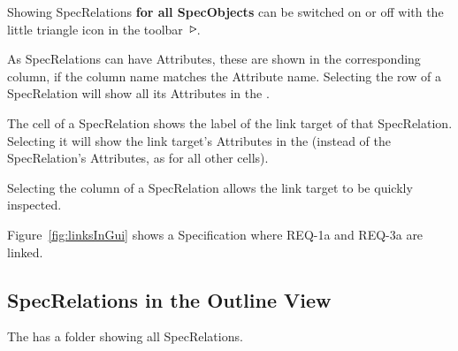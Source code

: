 Showing SpecRelations \textbf{for all SpecObjects} can be switched on or off with the little triangle icon in the toolbar \includegraphics[height=0.8em]{../rmf-images/icons/full/obj16/SpecRelation.png}.

As SpecRelations can have Attributes, these are shown in the corresponding column, if the column name matches the Attribute name.  Selecting the row of a SpecRelation will show all its Attributes in the .

The  cell of a SpecRelation shows the label of the link target of that SpecRelation.  Selecting it will show the link target's Attributes in the  (instead of the SpecRelation's Attributes, as for all other cells).

\begin{info}
Selecting the  column of a SpecRelation allows the link target to be quickly inspected.
\end{info}

Figure~\ref{fig:linksInGui} shows a Specification where REQ-1a and REQ-3a are linked.

\subsection{SpecRelations in the Outline View}

The  has a folder showing all SpecRelations.

